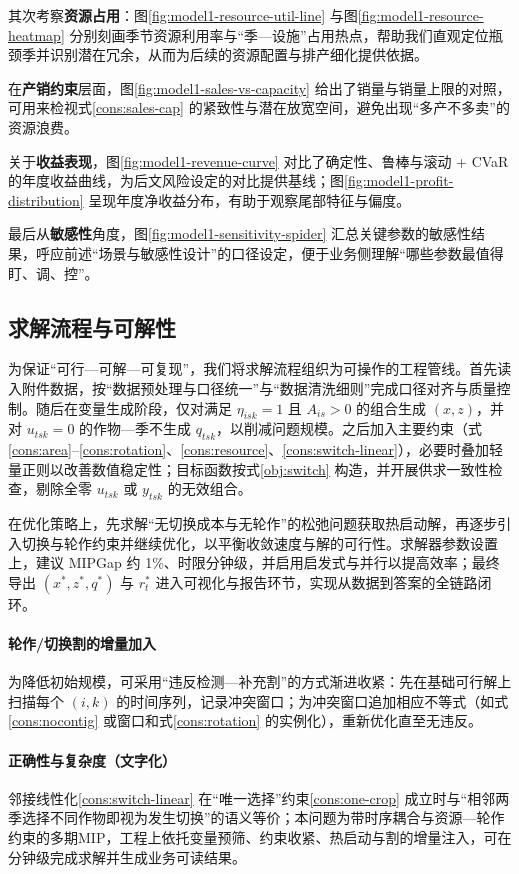 其次考察\textbf{资源占用}：图\ref{fig:model1-resource-util-line} 与图\ref{fig:model1-resource-heatmap} 分别刻画季节资源利用率与“季—设施”占用热点，帮助我们直观定位瓶颈季并识别潜在冗余，从而为后续的资源配置与排产细化提供依据。

在\textbf{产销约束}层面，图\ref{fig:model1-sales-vs-capacity} 给出了销量与销量上限的对照，可用来检视式\eqref{cons:sales-cap} 的紧致性与潜在放宽空间，避免出现“多产不多卖”的资源浪费。

关于\textbf{收益表现}，图\ref{fig:model1-revenue-curve} 对比了确定性、鲁棒与滚动 + CVaR 的年度收益曲线，为后文风险设定的对比提供基线；图\ref{fig:model1-profit-distribution} 呈现年度净收益分布，有助于观察尾部特征与偏度。

最后从\textbf{敏感性}角度，图\ref{fig:model1-sensitivity-spider} 汇总关键参数的敏感性结果，呼应前述“场景与敏感性设计”的口径设定，便于业务侧理解“哪些参数最值得盯、调、控”。

\subsection{求解流程与可解性}
为保证“可行—可解—可复现”，我们将求解流程组织为可操作的工程管线。首先读入附件数据，按“数据预处理与口径统一”与“数据清洗细则”完成口径对齐与质量控制。随后在变量生成阶段，仅对满足 $\eta_{isk}=1$ 且 $A_{is}>0$ 的组合生成 $(x,z)$，并对 $u_{tsk}=0$ 的作物—季不生成 $q_{tsk}$，以削减问题规模。之后加入主要约束（式\eqref{cons:area}--\eqref{cons:rotation}、\eqref{cons:resource}、\eqref{cons:switch-linear}），必要时叠加轻量正则以改善数值稳定性；目标函数按式\eqref{obj:switch} 构造，并开展供求一致性检查，剔除全零 $u_{tsk}$ 或 $y_{tsk}$ 的无效组合。

在优化策略上，先求解“无切换成本与无轮作”的松弛问题获取热启动解，再逐步引入切换与轮作约束并继续优化，以平衡收敛速度与解的可行性。求解器参数设置上，建议 MIPGap 约 1\%、时限分钟级，并启用启发式与并行以提高效率；最终导出 $(x^*,z^*,q^*)$ 与 $r_t^*$ 进入可视化与报告环节，实现从数据到答案的全链路闭环。

\paragraph{轮作/切换割的增量加入}
为降低初始规模，可采用“违反检测—补充割”的方式渐进收紧：先在基础可行解上扫描每个 $(i,k)$ 的时间序列，记录冲突窗口；为冲突窗口追加相应不等式（如式\eqref{cons:nocontig} 或窗口和式\eqref{cons:rotation} 的实例化），重新优化直至无违反。

\paragraph{正确性与复杂度（文字化）}
邻接线性化\eqref{cons:switch-linear} 在“唯一选择”约束\eqref{cons:one-crop} 成立时与“相邻两季选择不同作物即视为发生切换”的语义等价；本问题为带时序耦合与资源—轮作约束的多期MIP，工程上依托变量预筛、约束收紧、热启动与割的增量注入，可在分钟级完成求解并生成业务可读结果。

